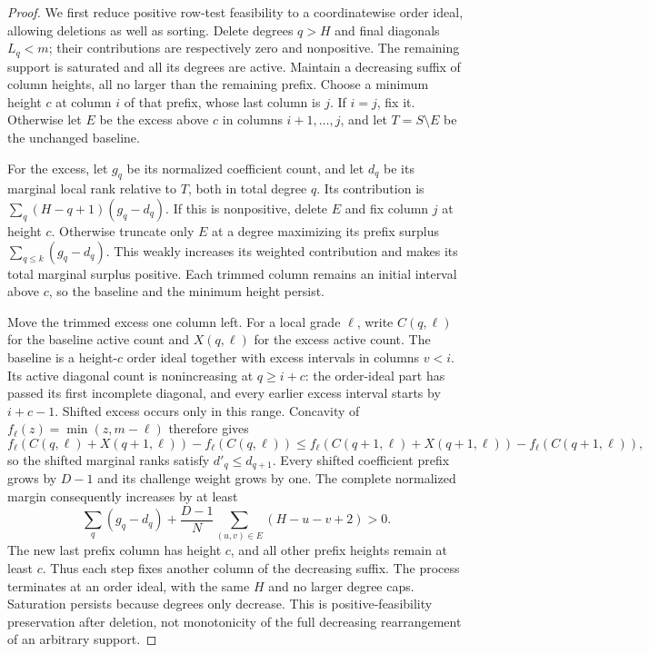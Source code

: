 \begin{proof}
We first reduce positive row-test feasibility to a coordinatewise order
ideal, allowing deletions as well as sorting. Delete degrees $q>H$ and
final diagonals $L_q<m$; their contributions are respectively zero and
nonpositive. The remaining support is saturated and all its degrees are
active. Maintain a decreasing suffix of column heights, all no larger
than the remaining prefix. Choose a minimum height $c$ at column $i$ of
that prefix, whose last column is $j$. If $i=j$, fix it. Otherwise let
$E$ be the excess above $c$ in columns $i+1,\ldots,j$, and let $T=S\setminus E$
be the unchanged baseline.

For the excess, let $g_q$ be its normalized coefficient count, and let
$d_q$ be its marginal local rank relative to $T$, both in total degree $q$.
Its contribution is $\sum_q(H-q+1)(g_q-d_q)$. If this is nonpositive,
delete $E$ and fix column $j$ at height $c$. Otherwise truncate only $E$
at a degree maximizing its prefix surplus
$\sum_{q\le k}(g_q-d_q)$. This weakly increases its weighted contribution
and makes its total marginal surplus positive. Each trimmed column remains
an initial interval above $c$, so the baseline and the minimum height persist.

Move the trimmed excess one column left. For a local grade $\ell$, write
$C(q,\ell)$ for the baseline active count and $X(q,\ell)$ for the excess
active count. The baseline is a height-$c$ order ideal together with excess
intervals in columns $v<i$. Its active diagonal count is nonincreasing at
$q\ge i+c$: the order-ideal part has passed its first incomplete diagonal,
and every earlier excess interval starts by $i+c-1$. Shifted excess occurs
only in this range. Concavity of $f_\ell(z)=\min(z,m-\ell)$ therefore gives
\[
 f_\ell(C(q,\ell)+X(q+1,\ell))-f_\ell(C(q,\ell))
 \le f_\ell(C(q+1,\ell)+X(q+1,\ell))-f_\ell(C(q+1,\ell)),
\]
so the shifted marginal ranks satisfy $d'_q\le d_{q+1}$. Every shifted
coefficient prefix grows by $D-1$ and its challenge weight grows by one.
The complete normalized margin consequently increases by at least
\[
 \sum_q(g_q-d_q)+\frac{D-1}{N}
       \sum_{(u,v)\in E}(H-u-v+2)>0.
\]
The new last prefix column has height $c$, and all other prefix heights
remain at least $c$. Thus each step fixes another column of the decreasing
suffix. The process terminates at an order ideal, with the same $H$ and
no larger degree caps. Saturation persists because degrees only decrease.
This is positive-feasibility preservation after deletion, not monotonicity
of the full decreasing rearrangement of an arbitrary support.


\end{proof}
